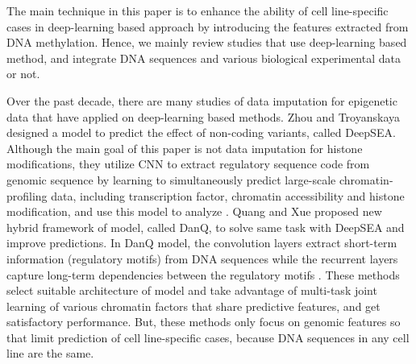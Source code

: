 \hspace{24pt}

The main technique in this paper is to enhance the ability of cell line-specific cases in deep-learning based approach by introducing the features extracted from DNA methylation. Hence, we mainly review studies that use deep-learning based method, and integrate DNA sequences and various biological experimental data or not.

Over the past decade, there are many studies of data imputation for epigenetic data that have applied on deep-learning based methods. Zhou and Troyanskaya designed a model to predict the effect of non-coding variants, called DeepSEA. Although the main goal of this paper is not data imputation for histone modifications, they utilize CNN to extract regulatory sequence code from genomic sequence by learning to simultaneously predict large-scale chromatin-profiling data, including transcription factor, chromatin accessibility and histone modification, and use this model to analyze \cite{zhou2015predicting}. Quang and Xue proposed new hybrid framework of model, called DanQ, to solve same task with DeepSEA and improve predictions. In DanQ model, the convolution layers extract short-term information (regulatory motifs) from DNA sequences while the recurrent layers capture long-term dependencies between the regulatory motifs \cite{quang2016danq}. These methods select suitable architecture of model and take advantage of multi-task joint learning of various chromatin factors that share predictive features, and get satisfactory performance. But, these methods only focus on genomic features so that limit prediction of cell line-specific cases, because DNA sequences in any cell line are the same.

